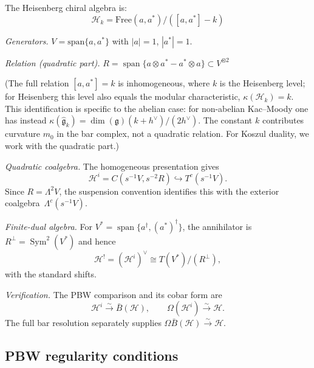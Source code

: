 \begin{example}\label{ex:heisenberg-quadratic-dual}
The Heisenberg chiral algebra is:
\[\mathcal{H}_k = \text{Free}(a, a^*) / ([a, a^*] - k)\]

\emph{Generators.} $V = \text{span}\{a, a^*\}$ with $|a| = 1$, $|a^*| = 1$.

\emph{Relation (quadratic part).} $R = \operatorname{span}\{a \otimes a^* - a^* \otimes a\} \subset V^{\otimes 2}$

(The full relation $[a, a^*] = k$ is inhomogeneous, where $k$ is the
Heisenberg level; for Heisenberg this level also equals the modular
characteristic, $\kappa(\mathcal{H}_k) = k$. This identification is
specific to the abelian case: for non-abelian Kac--Moody one has
instead $\kappa(\widehat{\mathfrak{g}}_k) = \dim(\mathfrak{g})(k+h^\vee)/(2h^\vee)$.
The constant $k$ contributes curvature $m_0$ in the bar complex,
not a quadratic relation. For Koszul duality, we work with the
quadratic part.)

\emph{Quadratic coalgebra.}
The homogeneous presentation gives
\[
 \mathcal H^i=C(s^{-1}V,s^{-2}R)\hookrightarrow T^c(s^{-1}V).
\]
Since $R=\Lambda^2V$, the suspension convention identifies this with
the exterior coalgebra~$\Lambda^c(s^{-1}V)$.

\emph{Finite-dual algebra.}
For
$V^*=\operatorname{span}\{a^\dagger,(a^*)^\dagger\}$, the annihilator
is $R^\perp=\operatorname{Sym}^2(V^*)$ and hence
\[
 \mathcal H^!=(\mathcal H^i)^\vee
 \cong T(V^*)/(R^\perp),
\]
with the standard shifts.

\emph{Verification.}
The PBW comparison and its cobar form are
\[
 \mathcal H^i\xrightarrow{\sim}\bar B(\mathcal H),
 \qquad
 \Omega(\mathcal H^i)\xrightarrow{\sim}\mathcal H.
\]
The full bar resolution separately supplies
$\Omega\bar B(\mathcal H)\xrightarrow{\sim}\mathcal H$.
\end{example}

\subsection{PBW regularity conditions}

